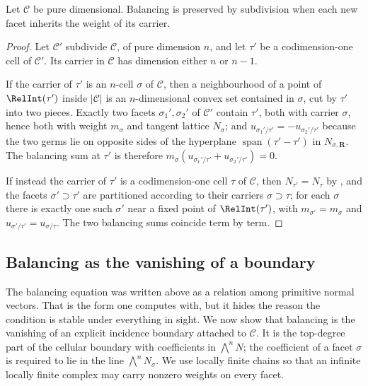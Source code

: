 \begin{proposition}
\label{prop:ch10-balancing-subdivision}
Let $\mathscr C$ be pure dimensional.  Balancing is preserved by subdivision
when each new facet inherits the weight of its carrier.
\end{proposition}
\begin{proof}
Let $\mathscr C'$ subdivide $\mathscr C$, of pure dimension $n$, and let
$\tau'$ be a codimension-one cell of $\mathscr C'$.  Its carrier in
$\mathscr C$ has dimension either $n$ or $n-1$.

If the carrier of $\tau'$ is an $n$-cell $\sigma$ of $\mathscr C$, then a
neighbourhood of a point of $\RelInt(\tau')$ inside $|\mathscr C|$ is an
$n$-dimensional convex set contained in $\sigma$, cut by $\tau'$ into two
pieces.  Exactly two facets $\sigma_1',\sigma_2'$ of $\mathscr C'$ contain
$\tau'$, both with carrier $\sigma$, hence both with weight $m_\sigma$ and
tangent lattice $N_\sigma$; and
$u_{\sigma_1'/\tau'}=-u_{\sigma_2'/\tau'}$ because the two germs lie on
opposite sides of the hyperplane $\operatorname{span}(\tau'-\tau')$ in
$N_{\sigma,\mathbf R}$.  The balancing sum at $\tau'$ is therefore
$m_\sigma(u_{\sigma_1'/\tau'}+u_{\sigma_2'/\tau'})=0$.

If instead the carrier of $\tau'$ is a codimension-one cell $\tau$ of
$\mathscr C$, then $N_{\tau'}=N_\tau$ by
, and the facets $\sigma'\supset\tau'$
are partitioned according to their carriers $\sigma\supset\tau$; for each
$\sigma$ there is exactly one such $\sigma'$ near a fixed point of
$\RelInt(\tau')$, with $m_{\sigma'}=m_\sigma$ and
$u_{\sigma'/\tau'}=u_{\sigma/\tau}$.  The two balancing sums coincide term by
term.
\end{proof}

\subsection{Balancing as the vanishing of a boundary}
\label{sec:ch10-balancing-boundary}

The balancing equation was written above as a relation among primitive normal
vectors.  That is the form one computes with, but it hides the reason the
condition is stable under everything in sight.  We now show that balancing is
the vanishing of an explicit incidence boundary attached to $\mathscr C$.
It is the top-degree part of the cellular boundary with coefficients in
$\bigwedge^nN$; the coefficient of a facet $\sigma$ is required to lie in
the line $\bigwedge^nN_\sigma$. We use locally finite chains so that an
infinite locally finite complex may carry nonzero weights on every facet.

